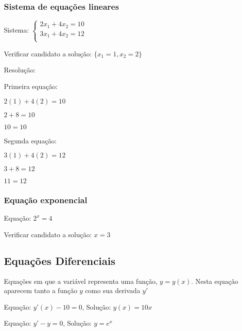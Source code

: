 \documentclass[a4paper]{article}
\providecommand{\sin}{} \renewcommand{\sin}{\hspace{2pt}\mathrm{sen}}
\begin{document}
\subsubsection{Sistema de equações lineares}

Sistema: $
\left\{ \begin{array}{c}
    2x_1 + 4x_2 = 10\\
    3x_1 + 4x_2 = 12\\
  \end{array}
\right.$

Verificar candidato a solução: $\{x_1= 1, x_2=2\}$

Resolução:

\begin{multicols}{2}
Primeira equação:

$2(1) +4(2)=10$

$2+8=10$

$10=10$

\columnbreak
Segunda equação:

$3(1)+4(2)=12$

$3+8=12$

$11=12$
\end{multicols}

\subsubsection{Equação exponencial}

Equação: $2^x = 4$

Verificar candidato a solução: $x=3$




\subsection{Equações Diferenciais}

Equações em que a variável representa uma função, $y=y(x)$. Nesta
equação aparecem tanto a função $y$ como sua derivada $y'$

Equação: $y'(x)-10=0$, Solução: $y(x)=10x$

Equação: $y'-y=0$, Solução: $y=e^x$
\end{document}
